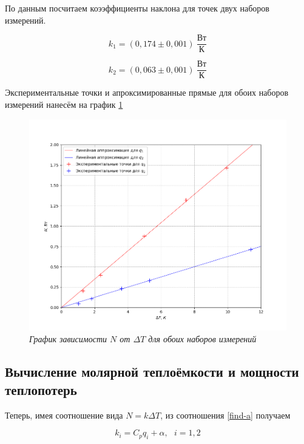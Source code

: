 \documentclass[a4paper,12pt]{article}
\begin{document}
По данным посчитаем коээффициенты наклона для точек двух наборов измерений.

\begin{equation}
    k_1 = (0,174 \pm 0,001) \ \frac{\text{Вт}}{\text{К}}
\end{equation}

\begin{equation}
    k_2 = (0,063 \pm 0,001) \ \frac{\text{Вт}}{\text{К}}
\end{equation}

Экспериментальные точки и апроксимированные прямые для обоих наборов измерений нанесём на график \ref{graph}

\begin{figure}[h!]
        \centering
	\includegraphics[width=1.1\textwidth]{graph.png}
	\caption{\textit{График зависимости $N$ от $\Delta T$ для обоих наборов измерений}}
	\label{graph}
\end{figure}


\subsection{Вычисление молярной теплоёмкости и мощности теплопотерь}

Теперь, имея соотношение вида $N = k \Delta T$, из соотношения \eqref{find-a} получаем

\begin{equation}
    k_i = C_p q_i + \alpha, \ \ \ i = 1, 2
\end{equation}
\end{document}
